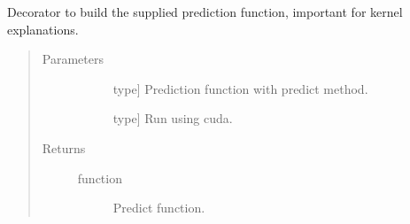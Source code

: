\documentclass[letterpaper,10pt,english]{sphinxmanual}
\begin{document}
\begin{fulllineitems}
\label{\detokenize{index:methylnet.interpretation_classes.return_predict_function}}
Decorator to build the supplied prediction function, important for kernel explanations.
\begin{quote}\begin{description}
\item[{Parameters}] \leavevmode\begin{description}
\item[{}] \leavevmode{[}type{]}
Prediction function with predict method.

\item[{}] \leavevmode{[}type{]}
Run using cuda.

\end{description}

\item[{Returns}] \leavevmode\begin{description}
\item[{function}] \leavevmode
Predict function.

\end{description}

\end{description}\end{quote}

\end{fulllineitems}

\end{document}

